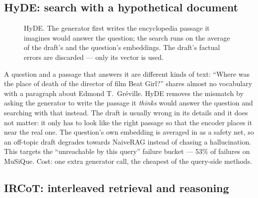 \subsection{HyDE: search with a hypothetical document}
\label{sec:arch-hyde}

\begin{figure}[t]
\centering
{}
\caption{HyDE. The generator first writes the encyclopedia passage it
imagines would answer the question; the search runs on the average of the
draft's and the question's embeddings. The draft's factual errors are
discarded --- only its vector is used.}
\label{fig:arch-hyde}
\end{figure}

A question and a passage that answers it are different kinds of text:
``Where was the place of death of the director of film Beat Girl?'' shares
almost no vocabulary with a paragraph about Edmond T.\ Gr\'eville. HyDE
\citep{gao2022hyde} removes the mismatch by asking the generator to write
the passage it \emph{thinks} would answer the question and searching with
that instead. The draft is usually wrong in its details and it does not
matter: it only has to look like the right passage so that the encoder
places it near the real one. The question's own embedding is averaged in
as a safety net, so an off-topic draft degrades towards NaiveRAG instead
of chasing a hallucination. This targets the ``unreachable by this query''
failure bucket --- 53\% of failures on MuSiQue. Cost: one extra generator
call, the cheapest of the query-side methods.

\subsection{IRCoT: interleaved retrieval and reasoning}
\label{sec:arch-ircot}

